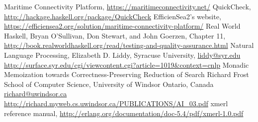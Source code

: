 \begin{thebibliography}{9}
		Maritime Connectivity Platform,
		\url{https://maritimeconnectivity.net/}
		QuickCheck,
		\url{http://hackage.haskell.org/package/QuickCheck}
		EfficienSea2's website,
		\url{https://efficiensea2.org/solution/maritime-connectivity-platform/}
		Real World Haskell,
		Bryan O'Sullivan, Don Stewart, and John Goerzen,
		Chapter 11,
		\url{http://book.realworldhaskell.org/read/testing-and-quality-assurance.html}
		Natural Language Processing,
		Elizabeth D. Liddy,
		Syracuse University,
		\url{liddy@syr.edu}
		\url{http://surface.syr.edu/cgi/viewcontent.cgi?article=1019&context=cnlp}
		Monadic Memoization towards Correctness-Preserving Reduction of Search
		Richard Frost
		School of Computer Science, University of Windsor
		Ontario, Canada
		\url{richard@uwindsor.ca}
		\url{http://richard.myweb.cs.uwindsor.ca/PUBLICATIONS/AI_03.pdf}
		xmerl reference manual,
		\url{http://erlang.org/documentation/doc-5.4/pdf/xmerl-1.0.pdf}
\end{thebibliography}